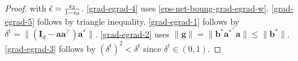 \documentclass{article}
\theoremstyle{plain}
\theoremstyle{definition}
\theoremstyle{remark}
\begin{document}
\begin{proof}
with $\Tilde{\epsilon} = \frac{\epsilon_3}{1-\epsilon_0}$.  \eqref{grad-egrad-4} uses \eqref{eps-net-boung-grad-egrad-w}. \eqref{grad-egrad-5} follows by triangle inequality. \eqref{grad-egrad-1} follows by $\delta^t = \|(\mathbf{I}_d - \mathbf{a}\mathbf{a}^\top)\mathbf{a}^* \|$. \eqref{grad-egrad-2} uses $\lVert \mathbf{g} \rVert = \lVert  \mathbf{b}^* \mathbf{a}^{*^\top} \mathbf{a} \rVert \leq \lVert  \mathbf{b}^* \rVert $. \eqref{grad-egrad-3} follows by $(\delta^{t})^{2} < \delta^t$ since $\delta^t \in (0,1)$. 


\end{proof}
\end{document}
